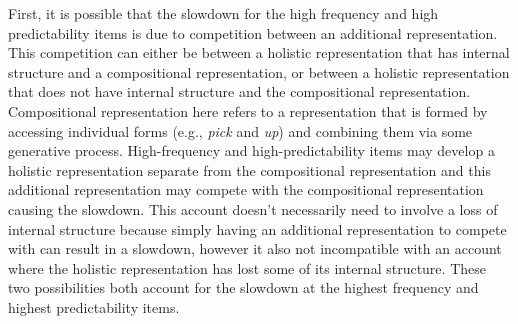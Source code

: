\documentclass[
  authoryear,
  preprint,
  1p,
  onecolumn]{elsarticle}
\begin{document}
First, it is possible that the slowdown for the high frequency and high
predictability items is due to competition between an additional
representation. This competition can either be between a holistic
representation that has internal structure and a compositional
representation, or between a holistic representation that does not have
internal structure and the compositional representation. Compositional
representation here refers to a representation that is formed by
accessing individual forms (e.g., \emph{pick} and \emph{up}) and
combining them via some generative process. High-frequency and
high-predictability items may develop a holistic representation separate
from the compositional representation and this additional representation
may compete with the compositional representation causing the slowdown.
This account doesn't necessarily need to involve a loss of internal
structure because simply having an additional representation to compete
with can result in a slowdown, however it also not incompatible with an
account where the holistic representation has lost some of its internal
structure. These two possibilities both account for the slowdown at the
highest frequency and highest predictability items.
\end{document}

